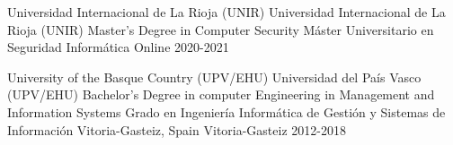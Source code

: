 	{}
	{}



\begin{cventries}
		
	\cventry
	{
			{Universidad Internacional de La Rioja (UNIR)}
			{Universidad Internacional de La Rioja (UNIR)}
	} %
	{
			{Master’s Degree in Computer Security}
			{Máster Universitario en Seguridad Informática}
	} %
	{Online} %
	{2020-2021} %
	{}
	{}
		
	\cventry
	{
			{University of the Basque Country (UPV/EHU)}
			{Universidad del País Vasco (UPV/EHU)}
	} %
	{
			{Bachelor’s Degree in computer Engineering in Management and Information Systems}
			{Grado en Ingeniería Informática de Gestión y Sistemas de Información}
	} %
	{
		{Vitoria-Gasteiz, Spain}
		{Vitoria-Gasteiz}
	} %
	{2012-2018} %
	{}
	{}
	
\end{cventries}